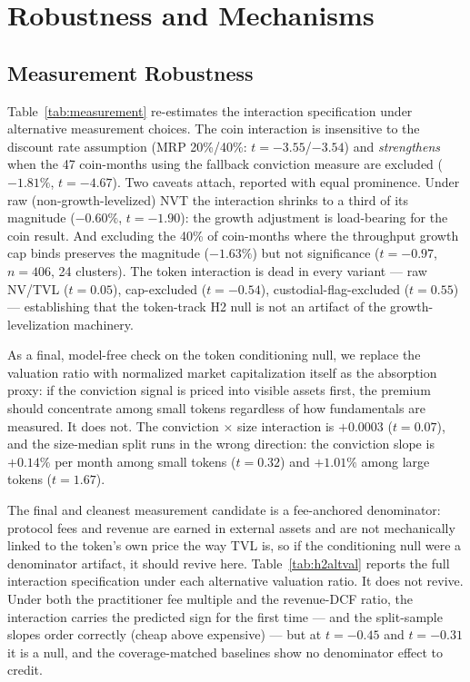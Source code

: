 \documentclass[12pt]{article}
\begin{document}
\FloatBarrier
\section{Robustness and Mechanisms}
\label{sec:robust}

\subsection{Measurement Robustness}
\label{sec:robust_meas}

Table~\ref{tab:measurement} re-estimates the interaction specification under
alternative measurement choices. The coin interaction is insensitive to the discount
rate assumption (MRP 20\%/40\%: $t=-3.55$/$-3.54$) and \textit{strengthens} when the
47 coin-months using the fallback conviction measure are excluded ($-1.81\%$,
$t=-4.67$). Two caveats attach, reported with equal prominence. Under raw
(non-growth-levelized) NVT the interaction shrinks to a third of its magnitude
($-0.60\%$, $t=-1.90$): the growth adjustment is load-bearing for the coin result.
And excluding the 40\% of coin-months where the throughput growth cap binds preserves
the magnitude ($-1.63\%$) but not significance ($t=-0.97$, $n=406$, 24 clusters). The
token interaction is dead in every variant --- raw NV/TVL ($t=0.05$), cap-excluded
($t=-0.54$), custodial-flag-excluded ($t=0.55$) --- establishing that the token-track
H2 null is not an artifact of the growth-levelization machinery.

As a final, model-free check on the token conditioning null, we replace the valuation
ratio with normalized market capitalization itself as the absorption proxy: if the
conviction signal is priced into visible assets first, the premium should concentrate
among small tokens regardless of how fundamentals are measured. It does not. The
conviction $\times$ size interaction is $+0.0003$ ($t=0.07$), and the size-median split
runs in the wrong direction: the conviction slope is $+0.14\%$ per month among small
tokens ($t=0.32$) and $+1.01\%$ among large tokens ($t=1.67$).

The final and cleanest measurement candidate is a fee-anchored denominator: protocol
fees and revenue are earned in external assets and are not mechanically linked to the
token's own price the way TVL is, so if the conditioning null were a denominator
artifact, it should revive here. Table~\ref{tab:h2altval} reports the full interaction
specification under each alternative valuation ratio. It does not revive. Under both
the practitioner fee multiple and the revenue-DCF ratio, the interaction carries the
predicted sign for the first time --- and the split-sample slopes order correctly
(cheap above expensive) --- but at $t=-0.45$ and $t=-0.31$ it is a null, and the
coverage-matched baselines show no denominator effect to credit.
\end{document}

